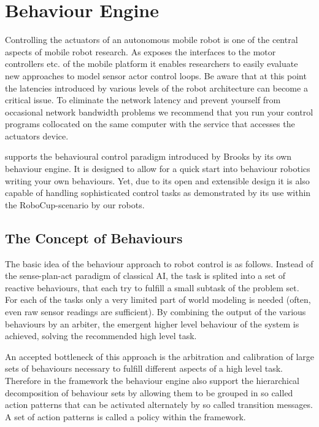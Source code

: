 \chapter{Behaviour Engine}
\label{SEC:BEHAVIOURS}

Controlling the actuators of an autonomous mobile robot is one of the
central aspects of mobile robot research. As \miro exposes the
interfaces to the motor controllers etc. of the mobile platform it
enables researchers to easily evaluate new approaches to model sensor
actor control loops. Be aware that at this point the latencies
introduced by various levels of the robot architecture can become a
critical issue. To eliminate the network latency and prevent yourself
from occasional network bandwidth problems we recommend that you run
your control programs collocated on the same computer with the service
that accesses the actuators device.

\miro supports the behavioural control paradigm introduced by Brooks
\cite{Brooks} by its own behaviour engine. It is designed to allow for
a quick start into behaviour robotics writing your own behaviours. Yet,
due to its open and extensible design it is also capable of handling
sophisticated control tasks as demonstrated by its use within the
RoboCup-scenario by our \sparrow robots.

\section{The Concept of Behaviours}

The basic idea of the behaviour approach to robot control is as
follows. Instead of the sense-plan-act paradigm of classical AI, the
task is splited into a set of reactive behaviours, that each try to
fulfill a small subtask of the problem set. For each of the tasks only
a very limited part of world modeling is needed (often, even raw
sensor readings are sufficient). By combining the output of the
various behaviours by an arbiter, the emergent higher level behaviour
of the system is achieved, solving the recommended high level task.

An accepted bottleneck of this approach is the arbitration and
calibration of large sets of behaviours necessary to fulfill different
aspects of a high level task. Therefore in the \miro framework the
behaviour engine also support the hierarchical decomposition of
behaviour sets by allowing them to be grouped in so called action
patterns that can be activated alternately by so called transition
messages. A set of action patterns is called a policy within the \miro
framework. 

